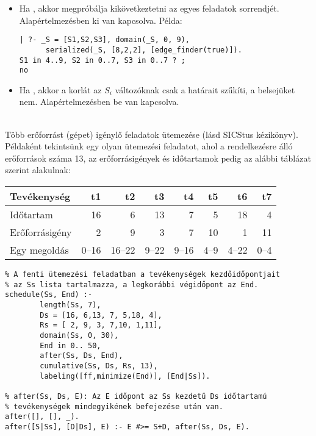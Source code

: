 \begin{itemize}
\item {}
          Ha  , akkor megpróbálja kikövetkeztetni az egyes
          feladatok sorrendjét. Alapértelmezésben ki van kapcsolva. Példa:
\begin{verbatim}
| ?- _S = [S1,S2,S3], domain(_S, 0, 9),
      serialized(_S, [8,2,2], [edge_finder(true)]).
S1 in 4..9, S2 in 0..7, S3 in 0..7 ? ;
no
\end{verbatim}

\item {}
          Ha  , akkor a korlát az $S_i$ változóknak
          csak a határait szűkíti, a belsejüket nem. Alapértelmezésben be van kapcsolva.

\end{itemize}

\medskip

{} \\
Több erőforrást (gépet) igénylő feladatok ütemezése (lásd SICStus kézikönyv).
\br
Példaként tekintsünk egy olyan ütemezési feladatot, ahol a rendelkezésre álló
erőforrások száma 13, az erőforrásigények és időtartamok pedig az alábbi táblázat
szerint alakulnak:

\begin{center}
\begin{tabular}{|l|r|r|r|r|r|r|r|}
\hline
Tevékenység               & t1   & t2    & t3   & t4   & t5   & t6   & t7 \\
\hline
Időtartam                 & 16   & 6     & 13   & 7    & 5    & 18   & 4 \\
Erőforrásigény            & 2    & 9     & 3    & 7    &10    & 1    &11\\
\hline
\hline
Egy megoldás              &0--16 &16--22 &9--22 &9--16 &4--9  &4--22 &0--4\\
\hline
\end{tabular}
\end{center}

\begin{verbatim}
% A fenti ütemezési feladatban a tevékenységek kezdőidőpontjait
% az Ss lista tartalmazza, a legkorábbi végidőpont az End.
schedule(Ss, End) :-
        length(Ss, 7),
        Ds = [16, 6,13, 7, 5,18, 4],
        Rs = [ 2, 9, 3, 7,10, 1,11],
        domain(Ss, 0, 30),
        End in 0.. 50,
        after(Ss, Ds, End),
        cumulative(Ss, Ds, Rs, 13),
        labeling([ff,minimize(End)], [End|Ss]).

% after(Ss, Ds, E): Az E időpont az Ss kezdetű Ds időtartamú
% tevékenységek mindegyikének befejezése után van.
after([], [], _).
after([S|Ss], [D|Ds], E) :- E #>= S+D, after(Ss, Ds, E).
\end{verbatim}

